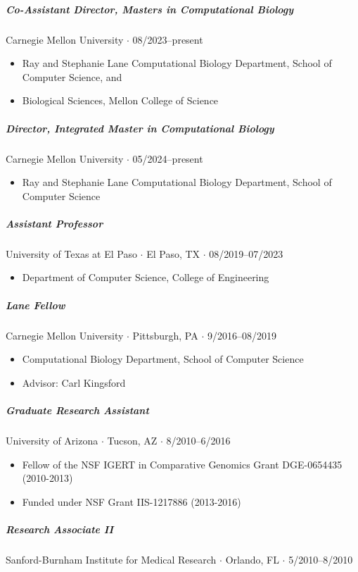 \documentclass[10pt,letterpaper]{article}
\newcommand{\bigdot}{$\cdot$\xspace}
\begin{document}
\subparagraph{Co-Assistant Director, Masters in Computational Biology}
Carnegie Mellon University \bigdot 08/2023--present
\begin{itemize}
    \item Ray and Stephanie Lane Computational Biology Department, School of Computer Science, and 
    \item Biological Sciences, Mellon College of Science
\end{itemize}

\subparagraph{Director, Integrated Master in Computational Biology}
Carnegie Mellon University  \bigdot 05/2024--present
\begin{itemize}
    \item Ray and Stephanie Lane Computational Biology Department, School of Computer Science
\end{itemize}

\subparagraph{Assistant Professor}
University of Texas at El Paso \bigdot El Paso, TX \bigdot 08/2019--07/2023
\begin{itemize}
	\item Department of Computer Science, College of Engineering
\end{itemize}


\subparagraph{Lane Fellow}
Carnegie Mellon University \bigdot Pittsburgh, PA \bigdot 9/2016--08/2019
\begin{itemize}
    \item Computational Biology Department, School of Computer Science
    \item Advisor: Carl Kingsford
\end{itemize}

\subparagraph{Graduate Research Assistant}
University of Arizona \bigdot Tucson, AZ \bigdot 8/2010--6/2016 
\begin{itemize}
    \item Fellow of the NSF IGERT in Comparative Genomics Grant DGE-0654435 (2010-2013)
    \item Funded under NSF Grant IIS-1217886 (2013-2016)
\end{itemize}

\subparagraph{Research Associate II}
Sanford-Burnham Institute for Medical Research \bigdot Orlando, FL \bigdot 5/2010--8/2010 
\end{document}
